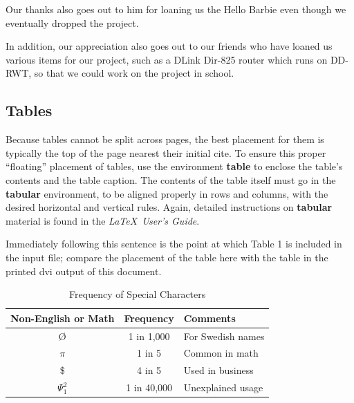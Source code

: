 \documentclass{acm_proc_article-sp}
\begin{document}
Our thanks also goes out to him for loaning us the Hello Barbie even though we eventually dropped the project. 

In addition, our appreciation also goes out to our friends who have loaned us various items for our project, such as a DLink Dir-825 router which runs on DD-RWT, so that we could work on the project in school. 

%

%
%

\newpage

\subsection{Tables}
Because tables cannot be split across pages, the best
placement for them is typically the top of the page
nearest their initial cite.  To
ensure this proper ``floating'' placement of tables, use the
environment \textbf{table} to enclose the table's contents and
the table caption.  The contents of the table itself must go
in the \textbf{tabular} environment, to
be aligned properly in rows and columns, with the desired
horizontal and vertical rules.  Again, detailed instructions
on \textbf{tabular} material
is found in the \textit{\LaTeX\ User's Guide}.

Immediately following this sentence is the point at which
Table 1 is included in the input file; compare the
placement of the table here with the table in the printed
dvi output of this document.

\begin{table}
\centering
\caption{Frequency of Special Characters}
\begin{tabular}{|c|c|l|} \hline
Non-English or Math&Frequency&Comments\\ \hline
\O & 1 in 1,000& For Swedish names\\ \hline
$\pi$ & 1 in 5& Common in math\\ \hline
\$ & 4 in 5 & Used in business\\ \hline
$\Psi^2_1$ & 1 in 40,000& Unexplained usage\\
\hline\end{tabular}
\end{table}
\end{document}
